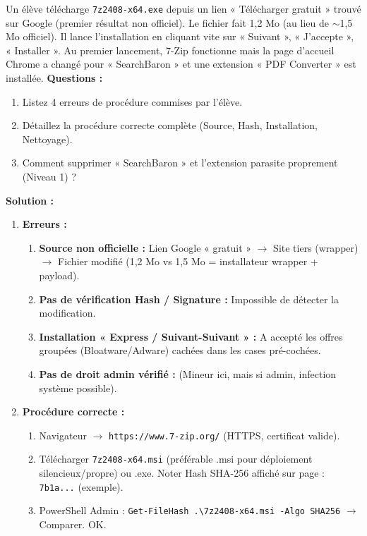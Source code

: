 \documentclass[11pt]{article}
\begin{document}
\begin{exoresolu}
Un élève télécharge \texttt{7z2408-x64.exe} depuis un lien « Télécharger gratuit » trouvé sur Google (premier résultat non officiel). Le fichier fait 1,2 Mo (au lieu de $\sim$1,5 Mo officiel). Il lance l'installation en cliquant vite sur « Suivant », « J'accepte », « Installer ». Au premier lancement, 7-Zip fonctionne mais la page d'accueil Chrome a changé pour « SearchBaron » et une extension « PDF Converter » est installée.
\textbf{Questions :}
\begin{enumerate}
    \item Listez 4 erreurs de procédure commises par l'élève.
    \item Détaillez la procédure correcte complète (Source, Hash, Installation, Nettoyage).
    \item Comment supprimer « SearchBaron » et l'extension parasite proprement (Niveau 1) ?
\end{enumerate}
\tcblower
\textbf{Solution :}
\begin{enumerate}
    \item \textbf{Erreurs :}
          \begin{enumerate}
              \item \textbf{Source non officielle :} Lien Google « gratuit » $\rightarrow$ Site tiers (wrapper) $\rightarrow$ Fichier modifié (1,2 Mo vs 1,5 Mo = installateur wrapper + payload).
              \item \textbf{Pas de vérification Hash / Signature :} Impossible de détecter la modification.
              \item \textbf{Installation « Express / Suivant-Suivant » :} A accepté les offres groupées (Bloatware/Adware) cachées dans les cases pré-cochées.
              \item \textbf{Pas de droit admin vérifié :} (Mineur ici, mais si admin, infection système possible).
          \end{enumerate}
    \item \textbf{Procédure correcte :}
          \begin{enumerate}
              \item Navigateur $\rightarrow$ \texttt{https://www.7-zip.org/} (HTTPS, certificat valide).
              \item Télécharger \texttt{7z2408-x64.msi} (préférable .msi pour déploiement silencieux/propre) ou .exe. Noter Hash SHA-256 affiché sur page : \texttt{7b1a...} (exemple).
              \item PowerShell Admin : \texttt{Get-FileHash .\textbackslash 7z2408-x64.msi -Algo SHA256} $\rightarrow$ Comparer. OK.

\end{enumerate}
\end{enumerate}
\end{exoresolu}
\end{document}
